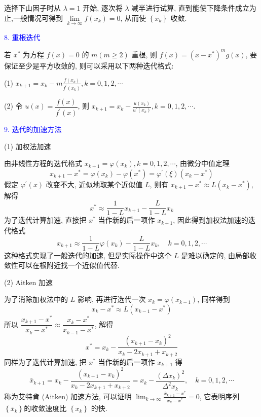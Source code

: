 选择下山因子时从 $ \lambda=1 $ 开始, 逐次将 $ \lambda $ 减半进行试算, 直到能使下降条件成立为止,一般情况可得到 $ \lim\limits _{k \rightarrow \infty} f\left(x_{k}\right)=0 $, 从而使 $ \left\{x_{k}\right\} $ 收敛.

\textcolor{blue}{8. 重根迭代}

若 $ x^{*} $ 为方程 $ f(x)=0 $ 的 $ m(m \geqslant 2) $ 重根, 则 $ f(x)=\left(x-x^{*}\right)^{m} g(x) $, 要保证至少是平方收敛的, 则可以采用以下两种迭代格式:

(1) $\displaystyle x_{k+1}=x_{k}-m \frac{f\left(x_{k}\right)}{f^{\prime}\left(x_{k}\right)}, k=0,1,2, \cdots $

(2) 令 $ u(x)=\dfrac{f(x)}{f^{\prime}(x)} $, 则 $\displaystyle x_{k+1}=x_{k}-\frac{u\left(x_{k}\right)}{u^{\prime}\left(x_{k}\right)}, k=0,1,2, \cdots $.

\textcolor{blue}{9. 迭代的加速方法}

(1) 加权法加速

由非线性方程的迭代格式 $ x_{k+1}=\varphi\left(x_{k}\right), k=0,1,2, \cdots $, 由微分中值定理
$$
x_{k+1}-x^{*}=\varphi\left(x_{k}\right)-\varphi\left(x^{*}\right)=\varphi^{\prime}(\xi)\left(x_{k}-x^{*}\right)
$$
假定 $ \varphi^{\prime}(x) $ 改变不大, 近似地取某个近似值 $ L $, 则有 $ x_{k+1}-x^{*} \approx L\left(x_{k}-x^{*}\right) $, 解得
$$
x^{*} \approx \frac{1}{1-L} x_{k+1}-\frac{L}{1-L} x_{k}
$$
为了迭代计算加速, 直接把 $ x^{*} $ 当作新的后一项作 $ x_{k+1} $, 因此得到加权法加速的迭代格式
$$
x_{k+1} \approx \frac{1}{1-L} \varphi\left(x_{k}\right)-\frac{L}{1-L} x_{k}, \quad k=0,1,2, \cdots
$$
这种格式实现了一般迭代的加速, 但是实际操作中这个 $ L $ 是难以确定的, 由局部收敛性可以在根附近找一个近似值代替.

(2) Aitken 加速

为了消除加权法中的 $ L $ 影响, 再进行选代一次 $ x_{k}=\varphi\left(x_{k-1}\right) $, 同样得到
$$
x_{k}-x^{*} \approx L\left(x_{k-1}-x^{*}\right)
$$
所以 $ \dfrac{x_{k+1}-x^{*}}{x_{k}-x^{*}} \approx \dfrac{x_{k}-x^{*}}{x_{k-1}-x^{*}} $, 解得
$$
x^{*}=x_{k}-\frac{\left(x_{k+1}-x_{k}\right)^{2}}{x_{k}-2 x_{k+1}+x_{k+2}}
$$
同样为了迭代计算加速, 把 $ x^{*} $ 当作新的后一项作 $ x_{k+1} $ 得
$$
\bar{x}_{k+1}=x_{k}-\frac{\left(x_{k+1}-x_{k}\right)^{2}}{x_{k}-2 x_{k+1}+x_{k+2}}=x_{k}-\frac{\left(\Delta x_{k}\right)^{2}}{\Delta^{2} x_{k}}, \quad k=0,1,2, \cdots
$$
称为艾特肯 (Aitken) 加速方法, 可以证明 $\displaystyle \lim _{k \rightarrow \infty} \frac{\bar{x}_{k+1}-x^{*}}{x_{k}-x^{*}}=0 $, 它表明序列 $ \left\{\bar{x}_{k}\right\} $的收敛速度比 $ \left\{x_{k}\right\} $ 的快.

